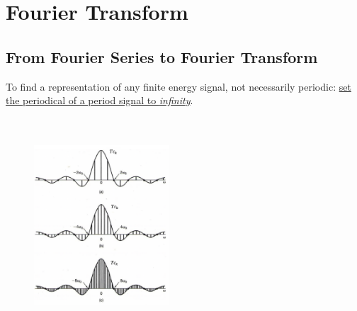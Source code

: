 \section{Fourier Transform}
\subsection{From Fourier Series to Fourier Transform}
\begin{ex}{}
    To find a representation of any finite energy signal, not necessarily periodic: \underline{set the periodical of a period signal to \textit{infinity}}.\\
    
    \\\\
    
    \begin{figure}
        \includegraphics[width = 0.45\textwidth]{images/tincrease} \vspace{-3cm} 
    \end{figure}
    

\end{ex}
